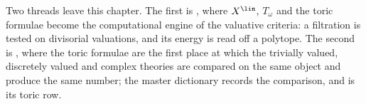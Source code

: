 Two threads leave this chapter.  The first is ,
where $X^{\lin}$, $T_\omega$ and the toric formulae become the
computational engine of the valuative criteria: a filtration is tested on
divisorial valuations, and its energy is read off a polytope.  The second
is , where the toric formulae are the first place at
which the trivially valued, discretely valued and complex theories are
compared on the same object and produce the same number; the master
dictionary  records the comparison, and
 is its toric row.
